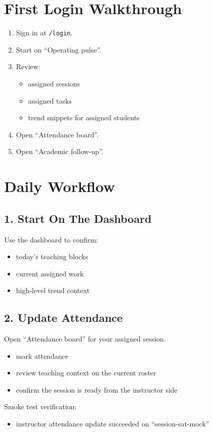 \documentclass[11pt]{article}
\begin{document}
\section*{First Login Walkthrough}
\begin{enumerate}
  \item Sign in at \texttt{/login}.
  \item Start on ``Operating pulse''.
  \item Review:
  \begin{itemize}
    \item assigned sessions
    \item assigned tasks
    \item trend snippets for assigned students
  \end{itemize}
  \item Open ``Attendance board''.
  \item Open ``Academic follow-up''.
\end{enumerate}

\section*{Daily Workflow}
\subsection*{1. Start On The Dashboard}
Use the dashboard to confirm:
\begin{itemize}
  \item today’s teaching blocks
  \item current assigned work
  \item high-level trend context
\end{itemize}

\subsection*{2. Update Attendance}
Open ``Attendance board'' for your assigned session.
\begin{itemize}
  \item mark attendance
  \item review teaching context on the current roster
  \item confirm the session is ready from the instructor side
\end{itemize}

Smoke test verification:
\begin{itemize}
  \item instructor attendance update succeeded on ``session-sat-mock''
\end{itemize}
\end{document}

